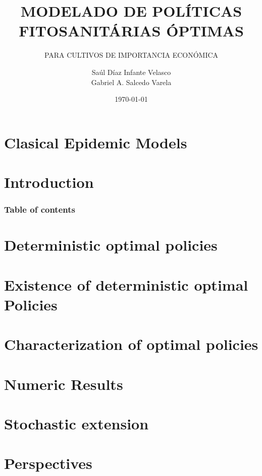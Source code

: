 \documentclass[9pt]{beamer}
\title{MODELADO DE POLÍTICAS \\ 
        \Huge{\textbf{FITOSANITÁRIAS ÓPTIMAS}}}
\subtitle{PARA CULTIVOS DE IMPORTANCIA ECONÓMICA}
\author{Saúl Díaz Infante Velasco
    \\
    Gabriel A. Salcedo Varela
}
\institute{CONACYT-UNIVERSIDAD de SONORA}
\date{\today}
\begin{document}
    \titlepage
    \section*{Clasical Epidemic Models}
        
    \section{Introduction}
        
    \begin{frame}
        \frametitle{Table of contents}
        \tableofcontents
    \end{frame}
        
    \section{Deterministic optimal policies}
        
        
    \section{Existence of deterministic optimal Policies}
        
    \section{Characterization of optimal policies}
        
    \section{Numeric Results}
        
    \section{Stochastic extension}
        
    \section{Perspectives}
        
\end{document}
